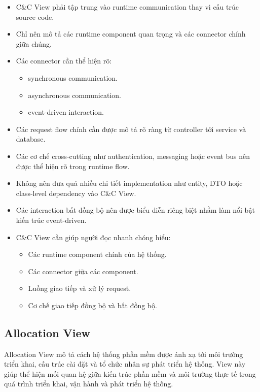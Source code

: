 \begin{itemize}
    \item C\&C View phải tập trung vào runtime communication thay vì cấu trúc source code.
    
    \item Chỉ nên mô tả các runtime component quan trọng và các connector chính giữa chúng.
    
    \item Các connector cần thể hiện rõ:
    \begin{itemize}
        \item synchronous communication.
        \item asynchronous communication.
        \item event-driven interaction.
    \end{itemize}
    
    \item Các request flow chính cần được mô tả rõ ràng từ controller tới service và database.
    
    \item Các cơ chế cross-cutting như authentication, messaging hoặc event bus nên được thể hiện rõ trong runtime flow.
    
    \item Không nên đưa quá nhiều chi tiết implementation như entity, DTO hoặc class-level dependency vào C\&C View.
    
    \item Các interaction bất đồng bộ nên được biểu diễn riêng biệt nhằm làm nổi bật kiến trúc event-driven.
    
    \item C\&C View cần giúp người đọc nhanh chóng hiểu:
    \begin{itemize}
        \item Các runtime component chính của hệ thống.
        \item Các connector giữa các component.
        \item Luồng giao tiếp và xử lý request.
        \item Cơ chế giao tiếp đồng bộ và bất đồng bộ.
    \end{itemize}
\end{itemize}


\subsection{Allocation View}

Allocation View mô tả cách hệ thống phần mềm được ánh xạ tới môi trường triển khai, cấu trúc cài đặt và tổ chức nhân sự phát triển hệ thống. View này giúp thể hiện mối quan hệ giữa kiến trúc phần mềm và môi trường thực tế trong quá trình triển khai, vận hành và phát triển hệ thống.

